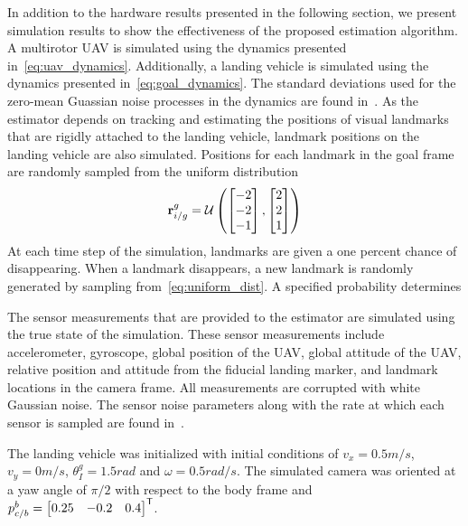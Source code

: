 
In addition to the hardware results presented in the following section, we
present simulation results to show the effectiveness of the proposed estimation
algorithm.
A multirotor UAV is simulated using the dynamics presented
in~\eqref{eq:uav_dynamics}.
Additionally, a landing vehicle is simulated using the dynamics presented
in~\eqref{eq:goal_dynamics}. The standard deviations used for the zero-mean
Guassian noise processes in the dynamics are found
in~.
As the estimator depends on
tracking and estimating the positions of visual landmarks that are rigidly
attached to the landing vehicle, landmark positions on the landing vehicle
are also simulated.
Positions for each landmark in the goal frame are
randomly sampled from the
uniform distribution
\begin{equation}
  \vect{r}_{i/g}^g = \mathcal{U}
  \left( \begin{bmatrix} -2 \\ -2 \\ -1 \end{bmatrix},
  \begin{bmatrix} 2 \\ 2 \\ 1 \end{bmatrix} \right)
  \label{eq:uniform_dist}
\end{equation}
At each time step of the simulation, landmarks are given a one percent chance
of disappearing. When a landmark disappears, a new landmark is randomly
generated by sampling from~\eqref{eq:uniform_dist}.
A specified probability determines

The sensor measurements that are provided to the estimator are simulated using the true
state of the simulation. These sensor measurements include accelerometer,
gyroscope, global position of the UAV, global attitude 
of the UAV, relative position and attitude from the fiducial landing marker, and
landmark locations in the camera frame. All measurements are
corrupted with white Gaussian noise. The sensor noise parameters along with the
rate at which each sensor is sampled are found
in~.

The landing vehicle was initialized with initial conditions of $v_x = 0.5
m/s$, $v_y = 0 m/s$, $\theta_I^g = 1.5 rad$ and $\omega = 0.5 rad/s$. The
simulated camera was oriented at a yaw angle of $\pi/2$ with respect to the body
frame and $p_{c/b}^b = \begin{bmatrix}0.25 & -0.2 &
0.4\end{bmatrix}^{\mathsf{T}}$.

